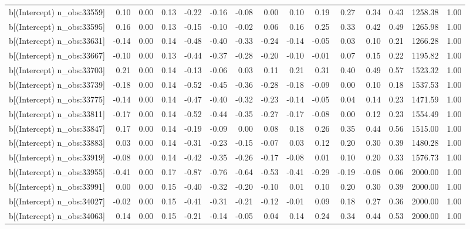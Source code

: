 \begin{table}[ht]
\begin{tabular}{rrrrrrrrrrrrrrr}
  b[(Intercept) n\_obs:33559] & 0.10 & 0.00 & 0.13 & -0.22 & -0.16 & -0.08 & 0.00 & 0.10 & 0.19 & 0.27 & 0.34 & 0.43 & 1258.38 & 1.00 \\ 
  b[(Intercept) n\_obs:33595] & 0.16 & 0.00 & 0.13 & -0.15 & -0.10 & -0.02 & 0.06 & 0.16 & 0.25 & 0.33 & 0.42 & 0.49 & 1265.98 & 1.00 \\ 
  b[(Intercept) n\_obs:33631] & -0.14 & 0.00 & 0.14 & -0.48 & -0.40 & -0.33 & -0.24 & -0.14 & -0.05 & 0.03 & 0.10 & 0.21 & 1266.28 & 1.00 \\ 
  b[(Intercept) n\_obs:33667] & -0.10 & 0.00 & 0.13 & -0.44 & -0.37 & -0.28 & -0.20 & -0.10 & -0.01 & 0.07 & 0.15 & 0.22 & 1195.82 & 1.00 \\ 
  b[(Intercept) n\_obs:33703] & 0.21 & 0.00 & 0.14 & -0.13 & -0.06 & 0.03 & 0.11 & 0.21 & 0.31 & 0.40 & 0.49 & 0.57 & 1523.32 & 1.00 \\ 
  b[(Intercept) n\_obs:33739] & -0.18 & 0.00 & 0.14 & -0.52 & -0.45 & -0.36 & -0.28 & -0.18 & -0.09 & 0.00 & 0.10 & 0.18 & 1537.53 & 1.00 \\ 
  b[(Intercept) n\_obs:33775] & -0.14 & 0.00 & 0.14 & -0.47 & -0.40 & -0.32 & -0.23 & -0.14 & -0.05 & 0.04 & 0.14 & 0.23 & 1471.59 & 1.00 \\ 
  b[(Intercept) n\_obs:33811] & -0.17 & 0.00 & 0.14 & -0.52 & -0.44 & -0.35 & -0.27 & -0.17 & -0.08 & 0.00 & 0.12 & 0.23 & 1554.49 & 1.00 \\ 
  b[(Intercept) n\_obs:33847] & 0.17 & 0.00 & 0.14 & -0.19 & -0.09 & 0.00 & 0.08 & 0.18 & 0.26 & 0.35 & 0.44 & 0.56 & 1515.00 & 1.00 \\ 
  b[(Intercept) n\_obs:33883] & 0.03 & 0.00 & 0.14 & -0.31 & -0.23 & -0.15 & -0.07 & 0.03 & 0.12 & 0.20 & 0.30 & 0.39 & 1480.28 & 1.00 \\ 
  b[(Intercept) n\_obs:33919] & -0.08 & 0.00 & 0.14 & -0.42 & -0.35 & -0.26 & -0.17 & -0.08 & 0.01 & 0.10 & 0.20 & 0.33 & 1576.73 & 1.00 \\ 
  b[(Intercept) n\_obs:33955] & -0.41 & 0.00 & 0.17 & -0.87 & -0.76 & -0.64 & -0.53 & -0.41 & -0.29 & -0.19 & -0.08 & 0.06 & 2000.00 & 1.00 \\ 
  b[(Intercept) n\_obs:33991] & 0.00 & 0.00 & 0.15 & -0.40 & -0.32 & -0.20 & -0.10 & 0.01 & 0.10 & 0.20 & 0.30 & 0.39 & 2000.00 & 1.00 \\ 
  b[(Intercept) n\_obs:34027] & -0.02 & 0.00 & 0.15 & -0.41 & -0.31 & -0.21 & -0.12 & -0.01 & 0.09 & 0.18 & 0.27 & 0.36 & 2000.00 & 1.00 \\ 
  b[(Intercept) n\_obs:34063] & 0.14 & 0.00 & 0.15 & -0.21 & -0.14 & -0.05 & 0.04 & 0.14 & 0.24 & 0.34 & 0.44 & 0.53 & 2000.00 & 1.00 \\ 

\end{tabular}
\end{table}
